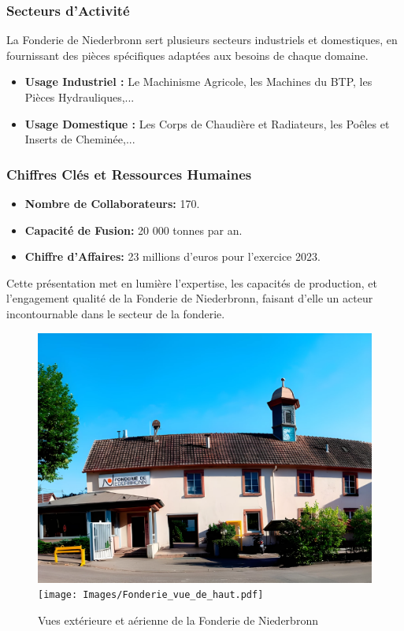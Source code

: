 \documentclass[12pt]{article}
\begin{document}
\subsubsection*{Secteurs d'Activité}
\sloppy
La Fonderie de Niederbronn sert plusieurs secteurs industriels et domestiques, 
en fournissant des pièces spécifiques adaptées aux besoins de chaque domaine.
\begin{itemize}
    \item \textbf{Usage Industriel :} Le Machinisme Agricole, les Machines du BTP, les Pièces Hydrauliques,...
    \item \textbf{Usage Domestique :} Les Corps de Chaudière et Radiateurs, les Poêles et Inserts de Cheminée,...
\end{itemize}

\subsubsection*{Chiffres Clés et Ressources Humaines}
\begin{itemize}
    \item \textbf{Nombre de Collaborateurs:} 170.
    \item \textbf{Capacité de Fusion:} 20 000 tonnes par an.
    \item \textbf{Chiffre d'Affaires:} 23 millions d'euros pour l'exercice 2023.
\end{itemize}


\sloppy
Cette présentation met en lumière l'expertise, les capacités de production,
et l'engagement qualité de la Fonderie de Niederbronn, faisant d'elle un acteur 
incontournable dans le secteur de la fonderie.


\begin{figure}[H]
    \centering
    \vfill
    \includegraphics[scale=0.27]{Images/Fonderie_vue_de_bas.pdf}
    \hspace{0.5 cm}
    \texttt{[image: Images/Fonderie\_vue\_de\_haut.pdf]}
    \caption{Vues extérieure et aérienne de la Fonderie de Niederbronn}
\end{figure}
\end{document}
